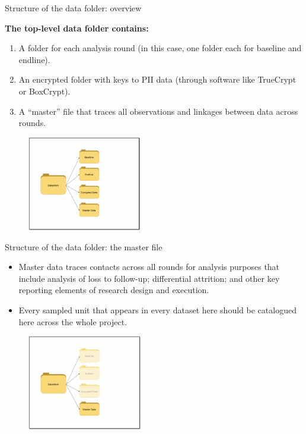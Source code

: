 \documentclass[aspectratio=169]{beamer}
\begin{document}
\begin{frame}[fragile]{Structure of the data folder: overview}
\begin{multicols}{2}	
	
	\textbf{The top-level data folder contains:}
	
	\begin{enumerate}
		\item<1> A folder for each analysis round (in this case, one folder each for baseline and endline).
		\item<1> An encrypted folder with keys to PII data (through software like TrueCrypt or BoxCrypt). 
		\item<1> A “master” file that traces all observations and linkages between data across rounds. 
	\end{enumerate}
	
	\begin{figure}
		\centering
		\includegraphics[width=50mm]{img/Structure2}
	\end{figure}
	
\end{multicols}
\end{frame}

\begin{frame}[fragile]{Structure of the data folder: the master file}
\begin{multicols}{2}	
	
	\begin{itemize}[<default overlay specification>]
		\item<1> Master data traces contacts across all rounds for analysis purposes that include analysis of loss to follow-up; differential attrition; and other key reporting elements of research design and execution. 
		\item<1> Every sampled unit that appears in every dataset here should be catalogued here across the whole project. 
	\end{itemize}
	
	\begin{figure}
		\centering
		\includegraphics[width=50mm]{img/Structure3}
	\end{figure}
	
\end{multicols}
\end{frame}
\end{document}
